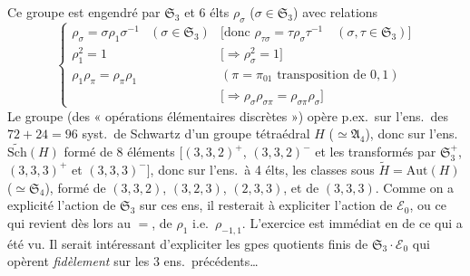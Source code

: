 \documentclass[11pt,a4paper]{article}
\begin{document}
Ce groupe est engendré par $\mathfrak{S}_3$ et 6 élts $\rho_{\sigma}$ ($\sigma \in \mathfrak{S}_3$) \struck{$\rho_{\sigma} = \sigma$} avec relations
\[
  \left\lbrace
  \begin{array}{lll}
    \rho_{\sigma} = \sigma \rho_1 \sigma^{-1} & (\sigma \in \mathfrak{S}_3) & \bigl[\text{donc } \rho_{\tau\sigma} = \tau \rho_{\sigma} \tau^{-1} \quad (\sigma, \tau \in \mathfrak{S}_3)\bigr] \\[3pt]
    \rho_1^{2} = 1 & & \bigl[\Longrightarrow \rho_{\sigma}^{2} = 1\bigr] \\[3pt]
    \rho_1 \rho_{\pi} = \rho_{\pi} \rho_1 & & (\pi = \pi_{01} \text{ transposition de } 0, 1) \\[3pt]
    & & \bigl[\Longrightarrow \rho_{\sigma} \rho_{\sigma\pi} = \rho_{\sigma\pi} \rho_{\sigma}\bigr]
  \end{array}
  \right.
\]
Le groupe \struck{\ill{}} (des « opérations élémentaires discrètes ») opère p.ex.\ sur l'ens.\ des $72 + 24 = 96$ syst.\ de Schwartz  d'un groupe tétraédral $H$ ($\simeq \mathfrak{A}_4$), donc sur l'ens.\ $\widetilde{\mathrm{Sch}}(H)$
formé de 8 éléments $\bigl[(3,3,2)^{+}$, $(3,3,2)^{-}$ et les transformés par $\mathfrak{S}_3^{+}$, $(3,3,3)^{+}$ et $(3,3,3)^{-}\bigr]$, donc sur l'ens.\ à 4 élts, les classes sous
$\widetilde{H} = \mathrm{Aut}(H)$ ($\simeq \mathfrak{S}_4$), formé de $(3,3,2)$, $(3,2,3)$, $(2,3,3)$, et de $(3,3,3)$.
Comme on a explicité l'action de $\mathfrak{S}_3$ sur ces ens, il resterait à expliciter l'action de $\mathcal{E}_0$, ou ce qui revient dès lors au $=$, de $\rho_1$ i.e.\ $\rho_{-1,1}$. L'exercice est immédiat en  de ce qui a été vu. \struck{\ill{}} Il serait intéressant d'expliciter les gpes quotients finis de $\mathfrak{S}_3 \cdot \mathcal{E}_0$ qui opèrent \emph{fidèlement} sur les 3 ens.\ précédents\ldots
{}
\end{document}
